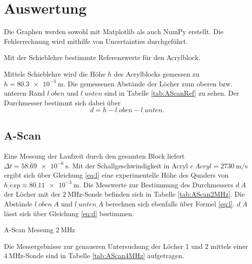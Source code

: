 \section{Auswertung}
\label{sec:Auswertung}

Die Graphen werden sowohl mit Matplotlib \cite{matplotlib} als auch NumPy \cite{numpy} erstellt. Die Fehlerrechnung wird mithilfe von Uncertainties \cite{uncertainties} durchgeführt.

\begin{table}
	\centering
	\caption{Mit der Schieblehre bestimmte Referenzwerte für den Acrylblock.}
	
	\label{tab:AScanRef}
\end{table}

\noindent Mittels Schieblehre wird die Höhe $h$ des Acrylblocks gemessen zu $h=\SI{80,3e-3}{\metre}$. Die gemessenen Abstände der Löcher zum oberen bzw. unteren Rand  $l_.{oben}$ und $l_.{unten}$ sind in Tabelle \ref{tab:AScanRef} zu sehen.
Der Durchmesser bestimmt sich dabei über
\begin{equation}
d = h-l_.{oben}-l_.{unten}\text{.}\label{eq:d}
\end{equation}

\subsection{A-Scan}
Eine Messung der Laufzeit durch den gesamten Block liefert $\Delta t = \SI{58,69e-6}{\second}$. Mit der Schallgeschwindigkeit in Acryl $c_.{Acryl}=\SI{2730}{\metre\per\second}$ ergibt sich über Gleichung \eqref{eq:l} eine experimentelle Höhe des Quaders von $h_.{exp}\approx\SI{80,11e-3}{\metre}$.\newline
Die Messwerte zur Bestimmung des Durchmessers $d_.A$ der Löcher mit der $\SI{2}{\mega\hertz}$-Sonde befinden sich in Tabelle \ref{tab:AScan2MHz}. Die Abstände $l_.{oben_.A}$ und $l_.{unten_.A}$ berechnen sich ebenfalls über Formel \eqref{eq:l}.
$d_.A$ lässt sich über Gleichung \eqref{eq:d} bestimmen. \newline

\begin{table}
	\centering
	\caption{A-Scan Messung $\SI{2}{\mega\hertz}$}
	
	\label{tab:AScan2MHz}
\end{table}

\noindent Die Messergebnisse zur genaueren Untersuchung der Löcher 1 und 2 mittels einer $\SI{4}{\mega\hertz}$-Sonde sind in Tabelle \ref{tab:AScan4MHz} aufgetragen.

